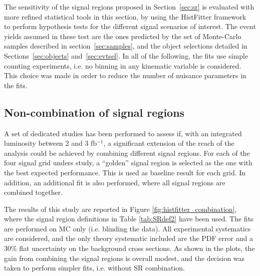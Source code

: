 The sensitivity of the signal regions proposed in Section~\ref{sec:sr} is evaluated with more refined statistical tools in this section, 
by using the HistFitter framework~\cite{HistFitter} to perform hypothesis tests for the different signal scenarios of interest. 
The event yields assumed in these test are the ones predicted by the set of Monte-Carlo samples described in section~\ref{sec:samples}, 
and the object selections detailed in Sections~\ref{sec:objects} and~\ref{sec:evtsel}. In all of the following, the fits use simple counting experiments,
i.e. no binning in any kinematic variable is considered. This choice was made in order to reduce the number of nuisance parameters in the fits.

\subsection{Non-combination of signal regions}

A set of dedicated studies has been performed to assess if, with an integrated luminosity between 2 and 3 fb$^{-1}$, a significant
extension of the reach of the analysis could be achieved by combining different signal regions.
For each of the four signal grid unders study, a ``golden'' signal region is selected as the one with the best expected performance. 
This is used as baseline result for each grid. In addition, an additional fit is also performed, where all signal regions are combined together.

The results of this study are reported in Figure \ref{fig:histfitter_combination}, where the signal region definitions in Table \ref{tab:SRdef2} have been used.
The fits are performed on MC only (i.e. blinding the data).
All experimental systematics are considered, and the only theory systematic included are the PDF error and a 30\% flat uncertainty on the background cross sections.
As shown in the plots, the gain from combining the signal regions is overall modest, and the decision was taken to perform simpler fits, i.e. without SR combination.

